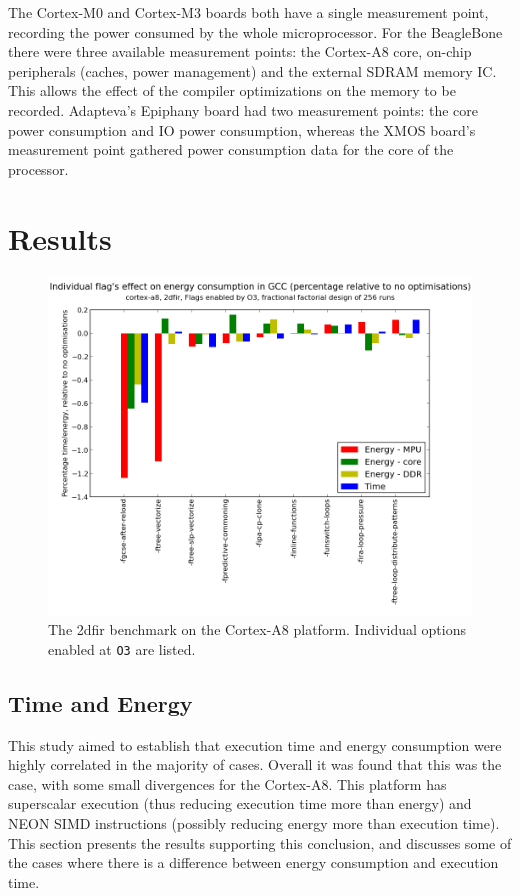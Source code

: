 \documentclass[twocolumn]{article}
\newcommand{\nsection}[1]{\section{\bfseries #1}}
\let\oldcaption\caption
\renewcommand{\caption}[1]{\oldcaption{\textup{#1}}}
\begin{document}
The Cortex-M0 and Cortex-M3 boards both have a single measurement point, recording the power consumed by the whole microprocessor. For the BeagleBone there were three available measurement points: the Cortex-A8 core, on-chip peripherals (caches, power management) and the external SDRAM memory IC. This allows the effect of the compiler optimizations on the memory to be recorded. Adapteva's Epiphany board had two measurement points: the core power consumption and IO power consumption, whereas the XMOS board's measurement point gathered power consumption data for the core of the processor.

\nsection{Results}

\begin{figure}[t]
	\includegraphics[width=\linewidth,clip,trim=0.5cm 0 2cm 1.8cm]{cortex-a8/O3_main_effects_2dfir.png}
	\caption{The 2dfir benchmark on the Cortex-A8 platform. Individual options enabled at \texttt{O3} are listed.}
	\label{Fig:O3_2dfir_A8}
\end{figure}

\subsection*{Time and Energy}

This study aimed to establish that execution time and energy consumption were highly correlated in the majority of cases. Overall it was found that this was the case, with some small divergences for the Cortex-A8. This platform has superscalar execution (thus reducing execution time more than energy) and NEON SIMD instructions (possibly reducing energy more than execution time). This section presents the results supporting this conclusion, and discusses some of the cases where there is a difference between energy consumption and execution time.
\end{document}
